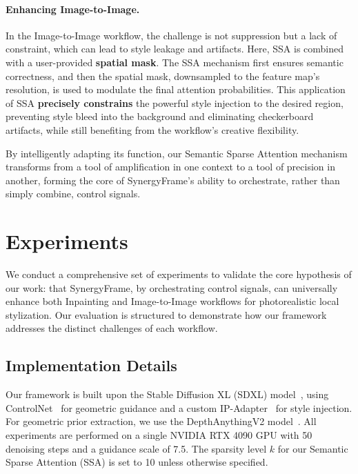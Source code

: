 \documentclass[letterpaper]{article} %
\begin{document}
\paragraph{Enhancing Image-to-Image.} In the Image-to-Image workflow, the challenge is not suppression but a lack of constraint, which can lead to style leakage and artifacts. Here, SSA is combined with a user-provided \textbf{spatial mask}. The SSA mechanism first ensures semantic correctness, and then the spatial mask, downsampled to the feature map's resolution, is used to modulate the final attention probabilities. This application of SSA \textbf{precisely constrains} the powerful style injection to the desired region, preventing style bleed into the background and eliminating checkerboard artifacts, while still benefiting from the workflow's creative flexibility.

By intelligently adapting its function, our Semantic Sparse Attention mechanism transforms from a tool of amplification in one context to a tool of precision in another, forming the core of SynergyFrame's ability to orchestrate, rather than simply combine, control signals.

\section{Experiments}
\label{sec:experiments}

We conduct a comprehensive set of experiments to validate the core hypothesis of our work: that SynergyFrame, by orchestrating control signals, can universally enhance both Inpainting and Image-to-Image workflows for photorealistic local stylization. Our evaluation is structured to demonstrate how our framework addresses the distinct challenges of each workflow.

\subsection{Implementation Details}
Our framework is built upon the Stable Diffusion XL (SDXL) model~\cite{podell2023sdxl}, using ControlNet~\cite{zhang2023controlnet} for geometric guidance and a custom IP-Adapter~\cite{ye2023ipadapter} for style injection. For geometric prior extraction, we use the DepthAnythingV2 model~\cite{yin2024depthanythingv2}. All experiments are performed on a single NVIDIA RTX 4090 GPU with 50 denoising steps and a guidance scale of 7.5. The sparsity level $k$ for our Semantic Sparse Attention (SSA) is set to 10 unless otherwise specified.
\end{document}

